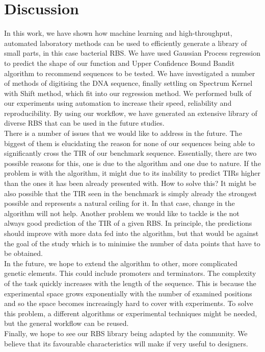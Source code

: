 \documentclass{article}
\begin{document}
\section{Discussion}

In this work, we have shown how machine learning and high-throughput, automated laboratory methods can be used to efficiently generate a library of small parts, in this case bacterial RBS. 
We have used Gaussian Process regression to predict the shape of our function and Upper Confidence Bound Bandit algorithm to recommend sequences to be tested.
We have investigated a number of methods of digitising the DNA sequence, finally settling on Spectrum Kernel with Shift method, which fit into our regression method.
We performed bulk of our experiments using automation to increase their speed, reliability and reproducibility.
By using our workflow, we have generated an extensive library of diverse RBS that can be used in the future studies.\\
There is a number of issues that we would like to address in the future.
The biggest of them is elucidating the reason for none of our sequences being able to significantly cross the TIR of our benchmark sequence.
Essentially, there are two possible reasons for this, one is due to the algorithm and one due to nature.
If the problem is with the algorithm, it might due to its inability to predict TIRs higher than the ones it has been already presented with.
How to solve this?
It might be also possible that the TIR seen in the benchmark is simply already the strongest possible and represents a natural ceiling for it. 
In that case, change in the algorithm will not help.
Another problem we would like to tackle is the not always good prediction of the TIR of a given RBS.
In principle, the predictions should improve with more data fed into the algorithm, but that would be against the goal of the study which is to minimise the number of data points that have to be obtained.\\
In the future, we hope to extend the algorithm to other, more complicated genetic elements.
This could include promoters and terminators.
The complexity of the task quickly increases with the length of the sequence.
This is because the experimental space grows exponentially with the number of examined positions and so the space becomes increasingly hard to cover with experiments.
To solve this problem, a different algorithms or experimental techniques might be needed, but the general workflow can be reused.\\
Finally, we hope to see our RBS library being adapted by the community.
We believe that its favourable characteristics will make if very useful to designers.
\end{document}
